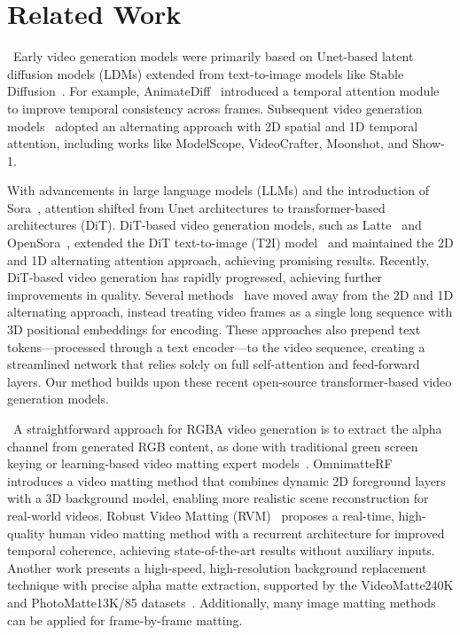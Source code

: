 \section{Related Work}
\label{sec:related}                             

~Early video generation models were primarily based on Unet-based latent diffusion models (LDMs) extended from text-to-image models like Stable Diffusion~\cite{rombach2022high}. For example, AnimateDiff~\cite{guo2023animatediff} introduced a temporal attention module to improve temporal consistency across frames. Subsequent video generation models~\cite{wang2023modelscope, cerspense2023zeroscope, chen2023videocrafter1, chen2024videocrafter2, zhang2024moonshot, zhang2023show} adopted an alternating approach with 2D spatial and 1D temporal attention, including works like ModelScope, VideoCrafter, Moonshot, and Show-1. 

With advancements in large language models (LLMs) and the introduction of Sora~\cite{sora2024}, attention shifted from Unet architectures to transformer-based architectures (DiT). DiT-based video generation models, such as Latte~\cite{ma2024latte} and OpenSora~\cite{opensora}, extended the DiT text-to-image (T2I) model~\cite{chen2023pixart} and maintained the 2D and 1D alternating attention approach, achieving promising results. Recently, DiT-based video generation has rapidly progressed, achieving further improvements in quality. Several methods~\cite{yang2024cogvideox, opensoraplan, genmo2024mochi} have moved away from the 2D and 1D alternating approach, instead treating video frames as a single long sequence with 3D positional embeddings for encoding. These approaches also prepend text tokens—processed through a text encoder—to the video sequence, creating a streamlined network that relies solely on full self-attention and feed-forward layers. Our method builds upon these recent open-source transformer-based video generation models.


\vspace{0.5em}
~A straightforward approach for RGBA video generation is to extract the alpha channel from generated RGB content, as done with traditional green screen keying or learning-based video matting expert models~\cite{lin2023omnimatterf, lin2021real, lin2022robust}. OmnimatteRF~\cite{lin2023omnimatterf} introduces a video matting method that combines dynamic 2D foreground layers with a 3D background model, enabling more realistic scene reconstruction for real-world videos. Robust Video Matting (RVM)~\cite{lin2022robust} proposes a real-time, high-quality human video matting method with a recurrent architecture for improved temporal coherence, achieving state-of-the-art results without auxiliary inputs. Another work presents a high-speed, high-resolution background replacement technique with precise alpha matte extraction, supported by the VideoMatte240K and PhotoMatte13K/85 datasets~\cite{lin2021real}. Additionally, many image matting methods~\cite{chen2022pp, li2024matting, yao2024vitmatte, wang2024matting} can be applied for frame-by-frame matting.


